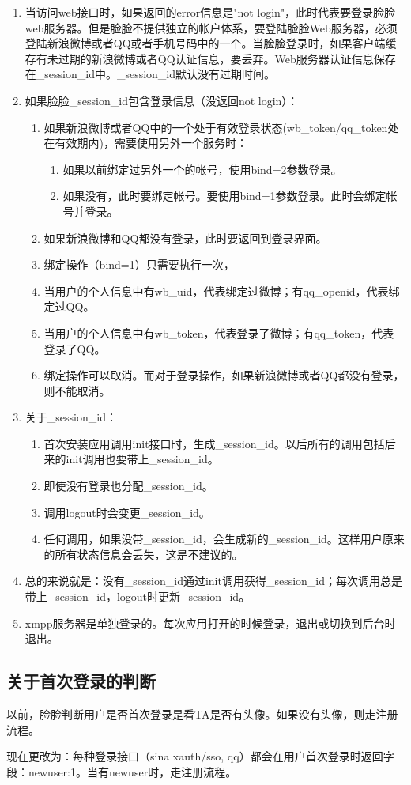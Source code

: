 \begin{enumerate}

\item 当访问web接口时，如果返回的error信息是"not login"，此时代表要登录脸脸web服务器。但是脸脸不提供独立的帐户体系，要登陆脸脸Web服务器，必须登陆新浪微博或者QQ或者手机号码中的一个。当脸脸登录时，如果客户端缓存有未过期的新浪微博或者QQ认证信息，要丢弃。Web服务器认证信息保存在\_session\_id中。\_session\_id默认没有过期时间。
\item 如果脸脸\_session\_id包含登录信息（没返回not login）：
\begin{enumerate}

\item 如果新浪微博或者QQ中的一个处于有效登录状态(wb\_token/qq\_token处在有效期内)，需要使用另外一个服务时：
\begin{enumerate}
\item 如果以前绑定过另外一个的帐号，使用bind=2参数登录。
\item 如果没有，此时要绑定帐号。要使用bind=1参数登录。此时会绑定帐号并登录。
\end{enumerate}

\item 如果新浪微博和QQ都没有登录，此时要返回到登录界面。
\item 绑定操作（bind=1）只需要执行一次，
\item 当用户的个人信息中有wb\_uid，代表绑定过微博；有qq\_openid，代表绑定过QQ。
\item 当用户的个人信息中有wb\_token，代表登录了微博；有qq\_token，代表登录了QQ。
\item 绑定操作可以取消。而对于登录操作，如果新浪微博或者QQ都没有登录，则不能取消。
\end{enumerate}

\item 关于\_session\_id：
\begin{enumerate}
\item 首次安装应用调用init接口时，生成\_session\_id。以后所有的调用包括后来的init调用也要带上\_session\_id。
\item 即使没有登录也分配\_session\_id。
\item 调用logout时会变更\_session\_id。
\item 任何调用，如果没带\_session\_id，会生成新的\_session\_id。这样用户原来的所有状态信息会丢失，这是不建议的。

\end{enumerate}

\item 总的来说就是：没有\_session\_id通过init调用获得\_session\_id；每次调用总是带上\_session\_id，logout时更新\_session\_id。


\item xmpp服务器是单独登录的。每次应用打开的时候登录，退出或切换到后台时退出。


\end{enumerate}


\subsection{关于首次登录的判断}
以前，脸脸判断用户是否首次登录是看TA是否有头像。如果没有头像，则走注册流程。

现在更改为：每种登录接口（sina xauth/sso, qq）都会在用户首次登录时返回字段：{newuser:1}。当有newuser时，走注册流程。
